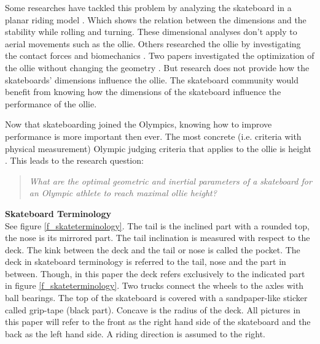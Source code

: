 \documentclass[default,iicol]{sn-jnl}
\theoremstyle{thmstyleone}%
\theoremstyle{thmstyletwo}%
\theoremstyle{thmstylethree}%
\begin{document}
Some researches have tackled this problem by analyzing the skateboard in a planar riding model \cite{hubbard_lateral_1979,hubbard_human_1980,kremnev_nonlinear_2010,ispolov_skateboard_1996,rosatello_skateboard_2015,varszegi_stability_2017,varszegi_stabilizing_2016,varszegi_downhill_2016,varszegi_balancing_2014,kuleshov_mathematical_2007,kuleshov_various_2010}. Which shows the relation between the dimensions and the stability while rolling and turning. These dimensional analyses don't apply to aerial movements such as the ollie. Others researched the ollie by investigating the contact forces \cite{anderson_ollie_2020,shield_contact-implicit_2022} and biomechanics \cite{frederick_biomechanics_2006,vorlicek_analysis_2015,wood_3d_2020,nakashima_simulation_2021,nevitt_ground_2006,candotti_lower_2012,dias_using_2016,anderson_ollie_2020,bridgman_human_1992,ou_postural_2021}. Two papers investigated the optimization of the ollie without changing the geometry \cite{anderson_ollie_2020,shield_contact-implicit_2022}. But research does not provide how the skateboards' dimensions influence the ollie. The skateboard community would benefit from knowing how the dimensions of the skateboard influence the performance of the ollie. 

Now that skateboarding joined the Olympics, knowing how to improve performance is more important then ever. The most concrete (i.e. criteria with physical measurement) Olympic judging criteria that applies to the ollie is height \cite{world_skate_skateboarding_2021}. This leads to the research question:
\begin{quote}
\textit{
    What are the optimal geometric and inertial parameters of a skateboard for an Olympic athlete to reach maximal ollie height?}
\end{quote}

\textbf{Skateboard Terminology}\\
See figure \ref{f_skateterminology}. The tail is the inclined part with a rounded top, the nose is its mirrored part. The tail inclination is measured with respect to the deck. The kink between the deck and the tail or nose is called the pocket. The deck in skateboard terminology is referred to the tail, nose and the part in between. Though, in this paper the deck refers exclusively to the indicated part in figure \ref{f_skateterminology}. Two trucks connect the wheels to the axles with ball bearings. The top of the skateboard is covered with a sandpaper-like sticker called grip-tape (black part). Concave is the radius of the deck. All pictures in this paper will refer to the front as the right hand side of the skateboard and the back as the left hand side. A riding direction is assumed to the right.
\end{document}
